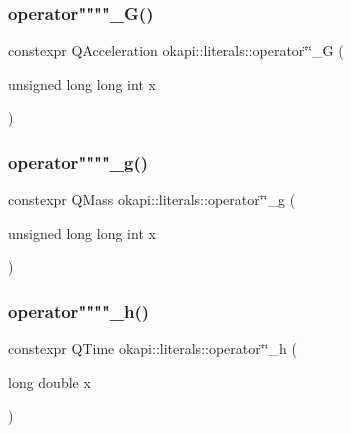 \mbox{\label{namespaceokapi_1_1literals_a41dfbc6575374e3b284f77002233f3c3}} 
\subsubsection{\texorpdfstring{operator""""\_G()}{operator""\_G()}\hspace{0.1cm}{\footnotesize\ttfamily [2/2]}}
{\footnotesize\ttfamily constexpr Q\+Acceleration okapi\+::literals\+::operator\char`\"{}\char`\"{}\+\_\+G (\begin{DoxyParamCaption}\item[{unsigned long long int}]{x }\end{DoxyParamCaption})}

\mbox{\label{namespaceokapi_1_1literals_a529ed712dda0f43a7ee831cbcf492d1a}} 
\subsubsection{\texorpdfstring{operator""""\_g()}{operator""\_g()}\hspace{0.1cm}{\footnotesize\ttfamily [2/2]}}
{\footnotesize\ttfamily constexpr Q\+Mass okapi\+::literals\+::operator\char`\"{}\char`\"{}\+\_\+g (\begin{DoxyParamCaption}\item[{unsigned long long int}]{x }\end{DoxyParamCaption})}

\mbox{\label{namespaceokapi_1_1literals_a866775de9a45754bd62ea36f9bd05a54}} 
\subsubsection{\texorpdfstring{operator""""\_h()}{operator""\_h()}\hspace{0.1cm}{\footnotesize\ttfamily [1/2]}}
{\footnotesize\ttfamily constexpr Q\+Time okapi\+::literals\+::operator\char`\"{}\char`\"{}\+\_\+h (\begin{DoxyParamCaption}\item[{long double}]{x }\end{DoxyParamCaption})}

